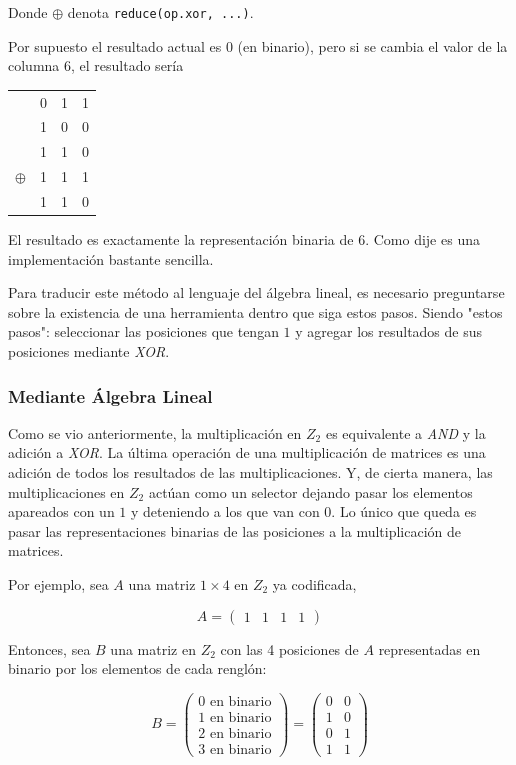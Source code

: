 \documentclass{article}
\begin{document}
Donde $\oplus$ denota \texttt{reduce(op.xor, ...)}.

Por supuesto el resultado actual es $0$ (en binario), pero si se cambia el valor de la columna 6, el resultado sería

\begin{center}
\begin{tabular}{c c c c}
    & 0 & 1 & 1 \\
    & 1 & 0 & 0 \\
    & 1 & 1 & 0 \\
    $\oplus$ & 1 & 1 & 1 \\
    \hline
    & 1 & 1 & 0
\end{tabular}
\end{center}

El resultado es exactamente la representación binaria de 6. Como dije es una implementación bastante sencilla.

Para traducir este método al lenguaje del álgebra lineal, es necesario preguntarse sobre la existencia de una herramienta dentro que siga estos pasos. Siendo "estos pasos": seleccionar las posiciones que tengan $1$ y agregar los resultados de sus posiciones mediante \textit{XOR}.

\subsubsection{Mediante Álgebra Lineal}

Como se vio anteriormente, la multiplicación en $Z_2$ es equivalente a \textit{AND} y la adición a \textit{XOR}. La última operación de una multiplicación de matrices es una adición de todos los resultados de las multiplicaciones. Y, de cierta manera, las multiplicaciones en $Z_2$ actúan como un selector dejando pasar los elementos apareados con un $1$ y deteniendo a los que van con $0$. Lo único que queda es pasar las representaciones binarias de las posiciones a la multiplicación de matrices.

Por ejemplo, sea $A$ una matriz $1 \times 4$ en $Z_2$ ya codificada,

$$
A = \begin{pmatrix}
    1 & 1 & 1 & 1
\end{pmatrix}
$$

Entonces, sea $B$ una matriz en $Z_2$ con las 4 posiciones de $A$ representadas en binario por los elementos de cada renglón:

$$
B = \begin{pmatrix}
    \text{0 en binario} \\
    \text{1 en binario} \\
    \text{2 en binario} \\
    \text{3 en binario}
\end{pmatrix}
= \begin{pmatrix}
    0 & 0 \\
    1 & 0 \\
    0 & 1 \\
    1 & 1
\end{pmatrix}
$$
\end{document}
